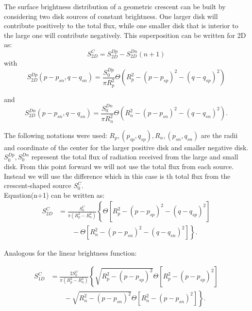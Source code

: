 The surface brightness distribution of a geometric crescent can be built by considering two disk sources of constant brightness. One larger disk will contribute positively to the total flux, while one smaller disk 
that is interior to the large one will contribute negatively. This superposition can be written for 2D as:\\

\begin{equation}
 S_{2D}^C =  S_{2D}^{Dp} -  S_{2D}^{Dn}   (n+1)
\end{equation}
with\\

\begin{equation}
 S_{2D}^{Dp}(p-p_{sn}, q-q_{sn}) = \frac{S_0^{Dp}}{\pi R_p^2} \Theta \left( R_p^2 - \left( p-p_{sp} \right)^2 - \left( q-q_{sp} \right)^2 \right)
\end{equation}

and\\
\begin{equation}
 S_{2D}^{Dn}(p-p_{sn}, q-q_{sn}) = \frac{S_0^{Dn}}{\pi R_n^2} \Theta \left( R_n^2 - \left( p-p_{sn} \right)^2 - \left( q-q_{sn} \right)^2 \right).
\end{equation}

The following notations were used: $R_p, (p_{sp}, q_{sp}), R_n, (p_{sn},q_{sn})$ are the radii and coordinate of the center for the larger positive disk and smaller negative disk.  
$S_0^{Dp},S_0^{Dn}$ represent the total flux of radiation received from the large and small disk. From this point forward we will not use the total flux from each source. Instead we will 
use the difference which in this case is th total flux from the crescent-shaped source $S_0^C$. \\
Equation(n+1) can be written as:\\

\begin{align}
 S_{2D}^C &= \frac{S_0^C}{\pi \left(R_p^2-R_n^2 \right)} \left\{ \Theta \left[ R_p^2 - \left( p-p_{sp} \right)^2 - \left( q-q_{sp} \right)^2 \right] \right.\nonumber\\
 &\qquad \left. {} -  \Theta \left[ R_n^2 - \left( p-p_{sn} \right)^2 - \left( q-q_{sn} \right)^2 \right] \right\}.
\end{align}

Analogous for the linear brightness function:

\begin{align}
 S_{1D}^C &= \frac{2 S_0^C}{\pi \left(R_p^2-R_n^2 \right)} \left\{ \sqrt{R_p^2 - (p-p_{sp})^2}  \Theta \left[ R_p^2 - \left( p-p_{sp} \right)^2 \right] \right.\nonumber\\
 &\qquad \left. {} - \sqrt{R_n^2 - (p-p_{sn})^2 } \Theta \left[ R_n^2 - \left( p-p_{sn} \right)^2 \right] \right\}.
\end{align}


